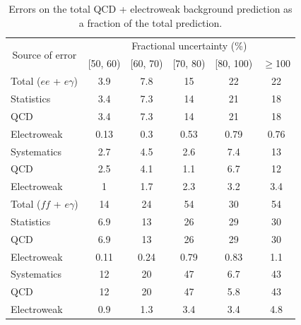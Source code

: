 \documentclass[dissertation.tex]{subfiles}
\begin{document}
\begin{table}[hcbp]
\caption{Errors on the total QCD + electroweak background prediction as a fraction of the total prediction.}
\centering
\begin{tabular}{|p{5cm}|c|c|c|c|c|}
\hline
\multicolumn{1}{|c|}{\multirow{2}{*}{Source of error}} & \multicolumn{5}{c|}{Fractional uncertainty (\%)} \\
\cline{2-6}
& [50, 60) & [60, 70) & [70, 80) & [80, 100) & $\geq$100 \\
\hline
\hline
Total ($ee$ + $e\gamma$) & 3.9 & 7.8 & 15 & 22 & 22 \\
\hline
\hspace{0.5cm}Statistics & 3.4 & 7.3 & 14 & 21 & 18 \\
\hline
\hspace{1cm}QCD & 3.4 & 7.3 & 14 & 21 & 18 \\
\hspace{1cm}Electroweak & 0.13 & 0.3 & 0.53 & 0.79 & 0.76 \\
\hline
\hspace{0.5cm}Systematics & 2.7 & 4.5 & 2.6 & 7.4 & 13 \\
\hline
\hspace{1cm}QCD & 2.5 & 4.1 & 1.1 & 6.7 & 12 \\
\hspace{1cm}Electroweak & 1 & 1.7 & 2.3 & 3.2 & 3.4 \\
\hline
Total ($\mathit{ff}$ + $e\gamma$) & 14 & 24 & 54 & 30 & 54 \\
\hline
\hspace{0.5cm}Statistics & 6.9 & 13 & 26 & 29 & 30 \\
\hline
\hspace{1cm}QCD & 6.9 & 13 & 26 & 29 & 30 \\
\hspace{1cm}Electroweak & 0.11 & 0.24 & 0.79 & 0.83 & 1.1 \\
\hline
\hspace{0.5cm}Systematics & 12 & 20 & 47 & 6.7 & 43 \\
\hline
\hspace{1cm}QCD & 12 & 20 & 47 & 5.8 & 43 \\
\hspace{1cm}Electroweak & 0.9 & 1.3 & 3.4 & 3.4 & 4.8 \\
\hline

\end{tabular}
\end{table}
\end{document}
